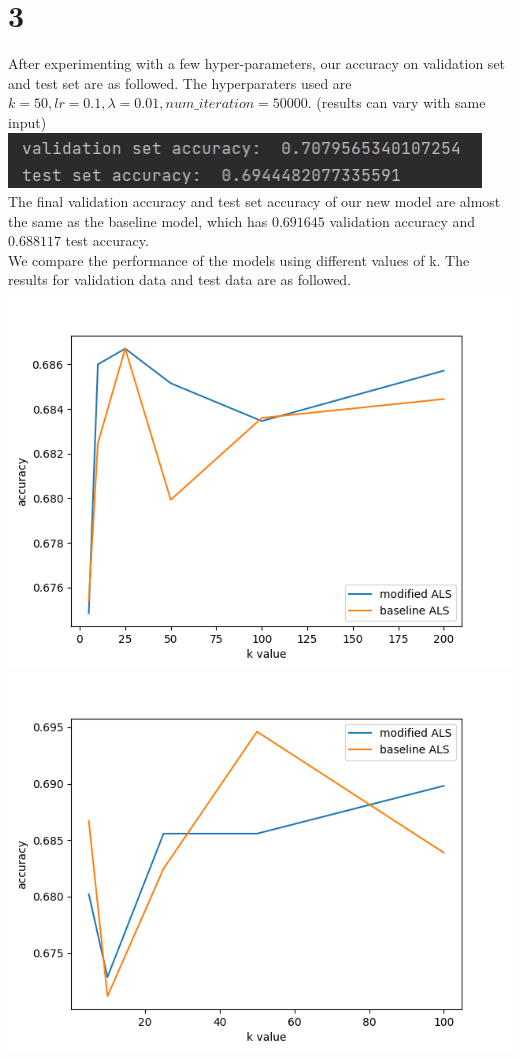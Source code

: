 \documentclass[12pt]{article}
\begin{document}
	\section*{3}
	After experimenting with a few hyper-parameters, our accuracy on validation set and test set are as followed. The hyperparaters used are $k=50,lr=0.1, \lambda=0.01, num\_iteration=50000$. (results can vary with same input)\\
	\includegraphics[scale=1]{b31}\\
	The final validation accuracy and test set accuracy of our new model are almost the same as the baseline model, which has $0.691645$ validation accuracy and $0.688117$ test accuracy.\\
	We compare the performance of the models using different values of k. The results for validation data and test data are as followed.\\
	\includegraphics[scale=0.5]{b32(2)} \includegraphics[scale=0.5]{b33c}\\	
\end{document}
